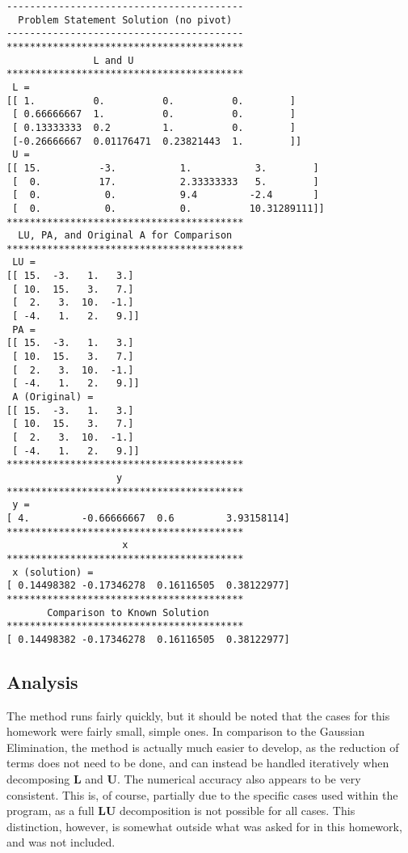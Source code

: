 \documentclass[10pt,letter]{article}
\begin{document}
\begin{verbatim}
-----------------------------------------
  Problem Statement Solution (no pivot)  
-----------------------------------------
*****************************************
               L and U                   
*****************************************
 L = 
[[ 1.          0.          0.          0.        ]
 [ 0.66666667  1.          0.          0.        ]
 [ 0.13333333  0.2         1.          0.        ]
 [-0.26666667  0.01176471  0.23821443  1.        ]]
 U = 
[[ 15.          -3.           1.           3.        ]
 [  0.          17.           2.33333333   5.        ]
 [  0.           0.           9.4         -2.4       ]
 [  0.           0.           0.          10.31289111]]
*****************************************
  LU, PA, and Original A for Comparison  
*****************************************
 LU = 
[[ 15.  -3.   1.   3.]
 [ 10.  15.   3.   7.]
 [  2.   3.  10.  -1.]
 [ -4.   1.   2.   9.]]
 PA = 
[[ 15.  -3.   1.   3.]
 [ 10.  15.   3.   7.]
 [  2.   3.  10.  -1.]
 [ -4.   1.   2.   9.]]
 A (Original) = 
[[ 15.  -3.   1.   3.]
 [ 10.  15.   3.   7.]
 [  2.   3.  10.  -1.]
 [ -4.   1.   2.   9.]]
*****************************************
                   y                     
*****************************************
 y = 
[ 4.         -0.66666667  0.6         3.93158114]
*****************************************
                    x                    
*****************************************
 x (solution) = 
[ 0.14498382 -0.17346278  0.16116505  0.38122977]
*****************************************
       Comparison to Known Solution      
*****************************************
[ 0.14498382 -0.17346278  0.16116505  0.38122977]

\end{verbatim}

\subsection{Analysis}

The method runs fairly quickly, but it should be noted that the cases for this homework were fairly small, simple ones. In comparison to the Gaussian Elimination, the method is actually much easier to develop, as the reduction of terms does not need to be done, and can instead be handled iteratively when decomposing \textbf{L} and \textbf{U}. The numerical accuracy also appears to be very consistent. This is, of course, partially due to the specific cases used within the program, as a full \textbf{LU} decomposition is not possible for all cases. This distinction, however, is somewhat outside what was asked for in this homework, and was not included.
\end{document}
